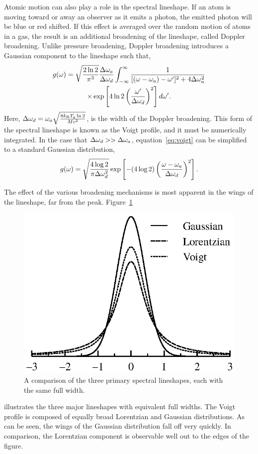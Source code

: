 Atomic motion can also play a role in the spectral lineshape. If an atom is
moving toward or away an observer as it emits a photon, the emitted photon will
be blue or red shifted. If this effect is averaged over the random motion of
atoms in a gas, the result is an additional broadening of the lineshape, called
Doppler broadening. Unlike pressure broadening, Doppler broadening introduces a
Gaussian component to the lineshape such that,
\begin{multline}
  g(\omega) = \sqrt{\frac{2\ln{2}}{\pi^3}}\frac{\Delta \omega_a}{\Delta \omega_d}
  \int_{-\infty}^\infty
  \frac{1}{[(\omega - \omega_a) - \omega']^2 + 4\Delta \omega_a^2} \\
  \times \exp\left[4\ln{2}\left(\frac{\omega'}{\Delta \omega_d}\right)^2\right]d\omega'.
  \label{eq:voigt}
\end{multline}
Here, $\Delta \omega_d = \omega_a\sqrt{\frac{8k_\mathrm{B}T_\mathrm{g}\ln{2}} {Mc^2}}$, is
the width of the Doppler broadening. This form of the spectral lineshape is
known as the Voigt profile, and it must be numerically integrated. In the case
that $\Delta \omega_d >> \Delta \omega_a$, equation~\ref{eq:voigt} can be simplified to a standard
Gaussian distribution,
\begin{equation}
  g(\omega) = \sqrt{\frac{4\log{2}}{\pi\Delta \omega_d^2}}
  \exp\left[-(4\log{2})\left(\frac{\omega-\omega_a}{\Delta \omega_d}\right)^2\right].
\end{equation}

The effect of the various broadening mechanisms is most apparent in the wings of
the lineshape, far from the peak. Figure~\ref{fig:lineshapes}
\begin{figure}
  \centering
  \includegraphics{./chapters/theory/figures/lineshapes.eps}
  \caption{A comparison of the three primary spectral lineshapes, each with the
  same full width.}
  \label{fig:lineshapes}
\end{figure}
illustrates the three major lineshapes with equivalent full widths. The Voigt
profile is composed of equally broad Lorentzian and Gaussian distributions. As
can be seen, the wings of the Gaussian distribution fall off very quickly. In
comparison, the Lorentzian component is observable well out to the edges of the
figure. 

